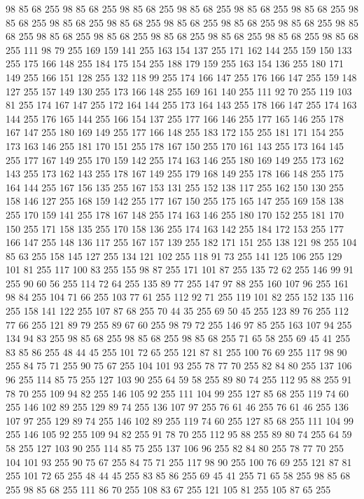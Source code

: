 98 85 68 255 98 85 68 255 98 85 68 255 98 85 68 255 98 85 68 255 98 85 68 255 98 85 68 255 98 85 68 255 98 85 68 255 98 85 68 255 98 85 68 255 98 85 68 255 98 85 68 255 98 85 68 255 98 85 68 255 98 85 68 255 98 85 68 255 98 85 68 255 98 85 68 255 111 98 79 255 169 159 141 255 163 154 137 255 171 162 144 255 159 150 133 255 175 166 148 255 184 175 154 255 188 179 159 255 163 154 136 255 180 171 149 255 166 151 128 255 132 118 99 255 174 166 147 255 176 166 147 255 159 148 127 255 157 149 130 255 173 166 148 255 169 161 140 255 111 92 70 255 119 103 81 255 174 167 147 255 172 164 144 255 173 164 143 255 178 166 147 255 174 163 144 255 176 165 144 255 166 154 137 255 177 166 146 255 177 165 146 255 178 167 147 255 180 169 149 255 177 166 148 255 183 172 155 255 181 171 154 255 173 163 146 255 181 170 151 255 178 167 150 255 170 161 143 255 173 164 145 255 177 167 149 255 170 159 142 255 174 163 146 255 180 169 149 255 173 162 143 255 173 162 143 255
178 167 149 255 179 168 149 255 178 166 148 255 175 164 144 255 167 156 135 255 167 153 131 255 152 138 117 255 162 150 130 255 158 146 127 255 168 159 142 255 177 167 150 255 175 165 147 255 169 158 138 255 170 159 141 255 178 167 148 255 174 163 146 255 180 170 152 255 181 170 150 255 171 158 135 255 170 158 136 255 174 163 142 255 184 172 153 255 177 166 147 255 148 136 117 255 167 157 139 255 182 171 151 255 138 121 98 255 104 85 63 255 158 145 127 255 134 121 102 255 118 91 73 255 141 125 106 255 129 101 81 255 117 100 83 255 155 98 87 255 171 101 87 255 135 72 62 255 146 99 91 255 90 60 56 255 114 72 64 255 135 89 77 255 147 97 88 255 160 107 96 255 161 98 84 255 104 71 66 255 103 77 61 255 112 92 71 255 119 101 82 255 152 135 116 255 158 141 122 255 107 87 68 255 70 44 35 255 69 50 45 255 123 89 76 255 112 77 66 255 121 89 79 255 89 67 60 255 98 79 72 255 146 97 85 255 163 107 94 255 134 94 83 255 98 85 68 255 98 85 68 255 98 85 68 255
71 65 58 255 69 45 41 255 83 85 86 255 48 44 45 255 101 72 65 255 121 87 81 255 100 76 69 255 117 98 90 255 84 75 71 255 90 75 67 255 104 101 93 255 78 77 70 255 82 84 80 255 137 106 96 255 114 85 75 255 127 103 90 255 64 59 58 255 89 80 74 255 112 95 88 255 91 78 70 255 109 94 82 255 146 105 92 255 111 104 99 255 127 85 68 255 119 74 60 255 146 102 89 255 129 89 74 255 136 107 97 255 76 61 46 255 76 61 46 255 136 107 97 255 129 89 74 255 146 102 89 255 119 74 60 255 127 85 68 255 111 104 99 255 146 105 92 255 109 94 82 255 91 78 70 255 112 95 88 255 89 80 74 255 64 59 58 255 127 103 90 255 114 85 75 255 137 106 96 255 82 84 80 255 78 77 70 255 104 101 93 255 90 75 67 255 84 75 71 255 117 98 90 255 100 76 69 255 121 87 81 255 101 72 65 255 48 44 45 255 83 85 86 255 69 45 41 255 71 65 58 255 98 85 68 255 98 85 68 255 111 86 70 255 108 83 67 255 121 105 81 255 105 87 65 255
